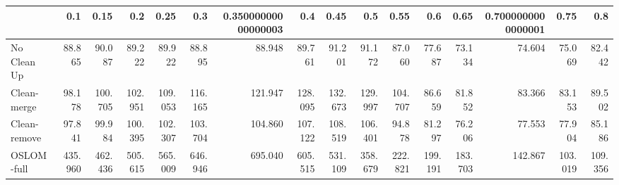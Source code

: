 \begin{tabular}{lrrrrrrrrrrrrrrr}
\toprule
{} &     0.1 &    0.15 &     0.2 &    0.25 &     0.3 & 0.35000000000000003 &     0.4 &    0.45 &     0.5 &    0.55 &     0.6 &    0.65 & 0.7000000000000001 &    0.75 &     0.8 \\
\midrule
No Clean Up  &  88.865 &  90.087 &  89.222 &  89.922 &  88.895 &              88.948 &  89.761 &  91.201 &  91.172 &  87.060 &  77.687 &  73.134 &             74.604 &  75.069 &  82.442 \\
Clean-merge  &  98.178 & 100.705 & 102.951 & 109.053 & 116.165 &             121.947 & 128.095 & 132.673 & 129.997 & 104.707 &  86.659 &  81.852 &             83.366 &  83.153 &  89.502 \\
Clean-remove &  97.841 &  99.984 & 100.395 & 102.307 & 103.704 &             104.860 & 107.122 & 108.519 & 106.401 &  94.878 &  81.297 &  76.206 &             77.553 &  77.904 &  85.186 \\
OSLOM-full   & 435.960 & 462.436 & 505.615 & 565.009 & 646.946 &             695.040 & 605.515 & 531.109 & 358.679 & 222.821 & 199.191 & 183.703 &            142.867 & 103.019 & 109.356 \\
\bottomrule
\end{tabular}
